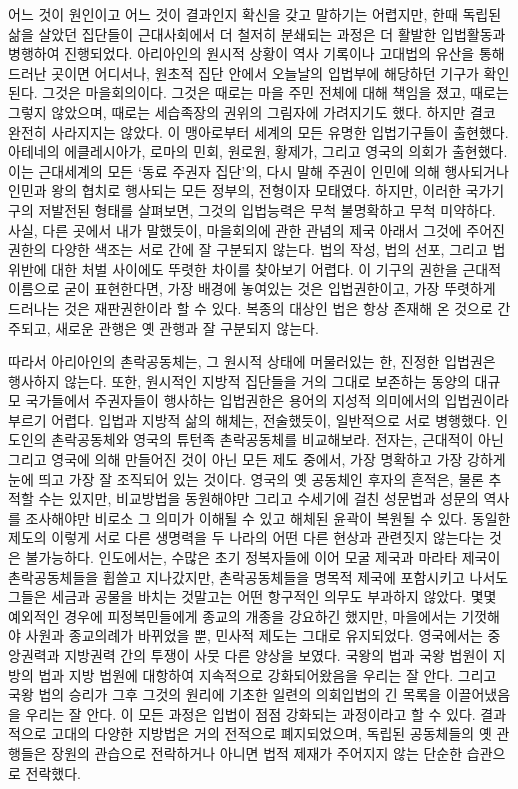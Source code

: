 어느 것이 원인이고 어느 것이 결과인지 확신을 갖고 말하기는 어렵지만,
한때 독립된 삶을 살았던 집단들이 근대사회에서 더 철저히 분쇄되는 과정은
더 활발한 입법활동과 병행하여 진행되었다.
아리아인의 원시적 상황이 역사 기록이나 고대법의 유산을 통해
드러난 곳이면 어디서나,
원초적 집단 안에서 오늘날의 입법부에 해당하던 기구가 확인된다.
그것은 마을회의이다.
그것은 때로는 마을 주민 전체에 대해 책임을 졌고,
때로는 그렇지 않았으며,
때로는 세습족장의 권위의 그림자에 가려지기도 했다.
하지만 결코 완전히 사라지지는 않았다.
이 맹아로부터 세계의 모든 유명한 입법기구들이 출현했다.
아테네의 에클레시아가, 로마의 민회, 원로원, 황제가,
그리고 영국의 의회가 출현했다.
이는 근대세계의 모든 
`동료 주권자 집단'의,
다시 말해 주권이 인민에 의해 행사되거나 인민과 왕의 협치로 행사되는
모든 정부의, 전형이자 모태였다.
하지만,
이러한 국가기구의 저발전된 형태를 살펴보면,
그것의 입법능력은 무척 불명확하고 무척 미약하다.
사실, 다른 곳에서 내가 말했듯이,
마을회의에 관한 관념의 제국 아래서
그것에 주어진 권한의 다양한 색조는 서로 간에 잘 구분되지 않는다.
법의 작성, 법의 선포, 그리고 법 위반에 대한 처벌 사이에도
뚜렷한 차이를 찾아보기 어렵다.
이 기구의 권한을 근대적 이름으로 굳이 표현한다면,
가장 배경에 놓여있는 것은 입법권한이고,
가장 뚜렷하게 드러나는 것은 재판권한이라 할 수 있다.
복종의 대상인 법은 항상 존재해 온 것으로 간주되고,
새로운 관행은 옛 관행과 잘 구분되지 않는다.

따라서 아리아인의 촌락공동체는, 그 원시적 상태에 머물러있는 한,
진정한 입법권은 행사하지 않는다.
또한,
원시적인 지방적 집단들을 거의 그대로 보존하는
동양의 대규모 국가들에서 주권자들이 행사하는 입법권한은
용어의 지성적 의미에서의 입법권이라 부르기 어렵다.
입법과 지방적 삶의 해체는, 전술했듯이, 일반적으로 서로 병행했다.
인도인의 촌락공동체와 영국의 튜턴족 촌락공동체를 비교해보라.
전자는, 근대적이 아닌 그리고 영국에 의해 만들어진 것이 아닌
모든 제도 중에서,
가장 명확하고 가장 강하게 눈에 띄고 가장 잘 조직되어 있는 것이다.
영국의 옛 공동체인 후자의 흔적은, 물론 추적할 수는 있지만,
비교방법을 동원해야만 그리고
수세기에 걸친 성문법과 성문의 역사를 조사해야만
비로소 그 의미가 이해될 수 있고
해체된 윤곽이 복원될 수 있다.
동일한 제도의 이렇게 서로 다른 생명력을 두 나라의 어떤 다른 현상과
관련짓지 않는다는 것은 불가능하다.
인도에서는,
수많은 초기 정복자들에 이어
모굴 제국과 마라타 제국이
촌락공동체들을 휩쓸고 지나갔지만,
촌락공동체들을 명목적 제국에 포함시키고 나서도
그들은 세금과 공물을 바치는 것말고는 어떤 항구적인 의무도 부과하지 않았다.
몇몇 예외적인 경우에
피정복민들에게 종교의 개종을 강요하긴 했지만,
마을에서는 기껏해야 사원과 종교의례가 바뀌었을 뿐,
민사적 제도는 그대로 유지되었다.
영국에서는 중앙권력과 지방권력 간의 투쟁이 사뭇 다른 양상을 보였다.
국왕의 법과 국왕 법원이 지방의 법과 지방 법원에 대항하여
지속적으로 강화되어왔음을 우리는 잘 안다.
그리고 국왕 법의 승리가 그후 그것의 원리에 기초한
일련의 의회입법의 긴 목록을 이끌어냈음을 우리는 잘 안다.
이 모든 과정은 입법이 점점 강화되는 과정이라고 할 수 있다.
결과적으로 고대의 다양한 지방법은 거의 전적으로 폐지되었으며,
독립된 공동체들의 옛 관행들은 장원의 관습으로 전락하거나
아니면 법적 제재가 주어지지 않는 단순한 습관으로 전락했다.

